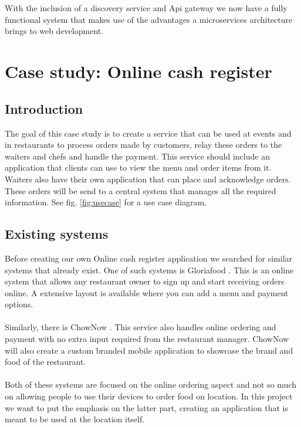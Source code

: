 \documentclass[12pt]{article}
\begin{document}
\begin{multicols}{2}
\\\\
With the inclusion of a discovery service and Api gateway we now have a fully functional system that makes use of the advantages a microservices architecture brings to web development. 





\end{multicols}
\section{Case study: Online cash register}\label{sec:casestudy}
\begin{multicols}{2}
\subsection{Introduction}
The goal of this case study is to create a service that can be used at events and in restaurants to process orders made by customers, relay these orders to the waiters and chefs and handle the payment. This service should include an application that clients can use to view the menu and order items from it. Waiters also have their own application that can place and acknowledge orders. These orders will be send to a central system that manages all the required information. See fig. \ref{fig:usecase} for a use case diagram.
\subsection{Existing systems}
Before creating our own Online cash register application we searched for similar systems that already exist. One of such systems is Gloriafood \cite{Gloriafood:online}. This is an online system that allows any restaurant owner to sign up and start receiving orders online. A extensive layout is available where you can add a menu and payment options.
\\\\
Similarly, there is ChowNow \cite{Chownow:online}. This service also handles online ordering and payment with no extra input required from the restaurant manager. ChowNow will also create a custom branded mobile application to showcase the brand and food of the restaurant.
\\\\
Both of these systems are focused on the online ordering aspect and not so much on allowing people to use their devices to order food on location. In this project we want to put the emphasis on the latter part, creating an application that is meant to be used at the location itself.

\end{multicols}
\end{document}
